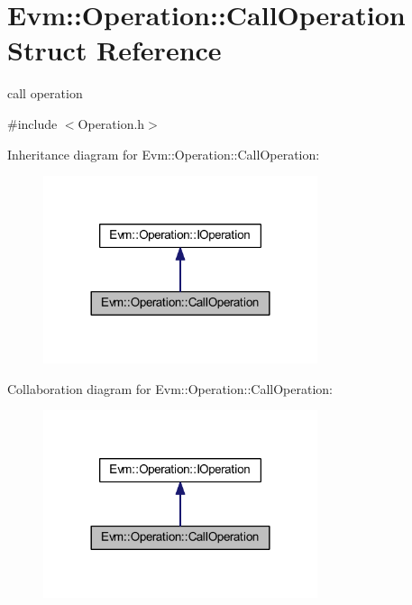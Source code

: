 \hypertarget{struct_evm_1_1_operation_1_1_call_operation}{}\section{Evm\+:\+:Operation\+:\+:Call\+Operation Struct Reference}
\label{struct_evm_1_1_operation_1_1_call_operation}


call operation  




{\ttfamily \#include $<$Operation.\+h$>$}



Inheritance diagram for Evm\+:\+:Operation\+:\+:Call\+Operation\+:
\nopagebreak
\begin{figure}[H]
\begin{center}
\leavevmode
\includegraphics[width=228pt]{struct_evm_1_1_operation_1_1_call_operation__inherit__graph}
\end{center}
\end{figure}


Collaboration diagram for Evm\+:\+:Operation\+:\+:Call\+Operation\+:
\nopagebreak
\begin{figure}[H]
\begin{center}
\leavevmode
\includegraphics[width=228pt]{struct_evm_1_1_operation_1_1_call_operation__coll__graph}
\end{center}
\end{figure}

